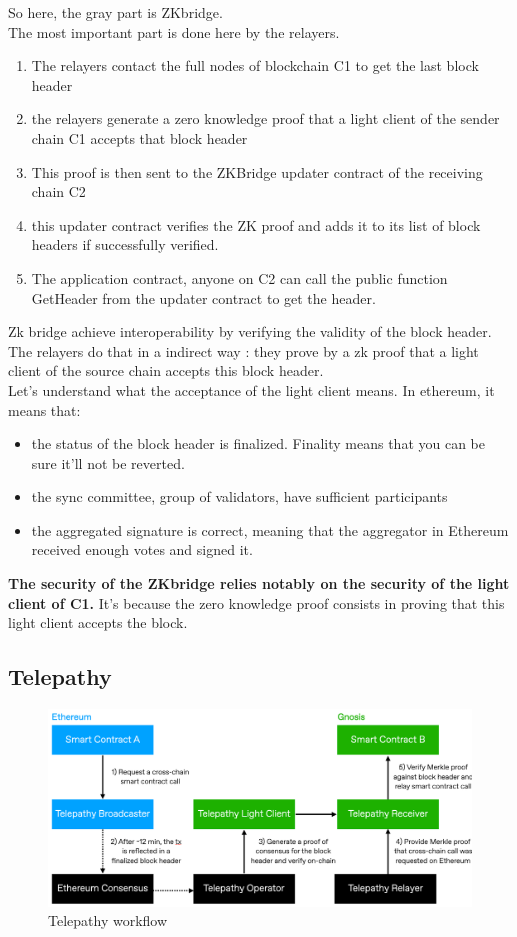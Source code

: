 So here, the gray part is ZKbridge.
\\The most important part is done here by the relayers. 
\begin{enumerate}
    \item The relayers contact the full nodes of blockchain C1 to get the last block header%
    \item the relayers generate a zero knowledge proof that a light client of the sender chain C1 accepts that block header
    \item This proof is then sent to the ZKBridge updater contract of the receiving chain C2
    \item this updater contract verifies the ZK proof and adds it to its list of block headers if successfully verified.
    \item The application contract, anyone on C2 can call the public function GetHeader from the updater contract to get the header. 
\end{enumerate}

Zk bridge achieve interoperability by verifying the validity of the block header. The relayers do that in a indirect way : they prove by a zk proof that a light client of the source chain accepts this block header. 
\\
Let's understand what the acceptance of the light client means. 
In ethereum, it means that: 
\begin{itemize}
    \item the status of the block header is finalized. Finality means that you can be sure it'll not be reverted. 
    \item the sync committee, group of validators, have sufficient participants 
    \item the aggregated signature is correct, meaning that the aggregator in Ethereum received enough votes and signed it.
\end{itemize}


\textbf{The security of the ZKbridge relies notably on the security of the light client of C1.} It's because the zero knowledge proof consists in proving that this light client accepts the block.
\subsection{Telepathy}

\begin{figure}[H]
    \centering
    \includegraphics[width=0.8\linewidth]{interoperability/telepathy.png}
    \caption{Telepathy workflow}
    \label{fig:telepathy}
\end{figure}

